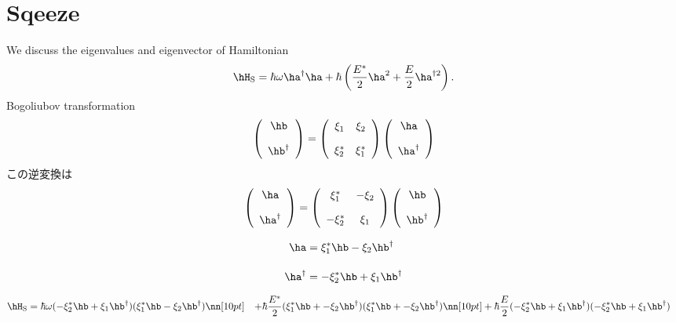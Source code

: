 \section{Sqeeze}
We discuss the eigenvalues and eigenvector of Hamiltonian
\begin{equation}
    \hH_{\rm{S}}=\hbar\omega\ha^\dag\ha + \hbar \left(\frac{E^\ast}{2}\ha^{2} + \frac{E}{2}\ha^{\dag2}\right).
\end{equation}
Bogoliubov transformation
\begin{align}
    \left( 
     \begin{array}{c}
     \hb\\[10pt]
     \hb^\dag
     \end{array}
    \right)
    =
    \left( 
     \begin{array}{cc}
     \xi_1&\xi_2 \\[10pt]
     \xi_2^{\ast}&\xi_1^{\ast}
     \end{array}
    \right)
    \left( 
     \begin{array}{c}
     \ha\\[10pt]
     \ha^\dag
     \end{array}
    \right)
\end{align}
この逆変換は
\begin{align}
    \left( 
     \begin{array}{c}
     \ha\\[10pt]
     \ha^\dag
     \end{array}
    \right)
    =
    \left( 
     \begin{array}{cc}
     \xi_1^{\ast}&-\xi_2 \\[10pt]
     -\xi_2^{\ast}&\xi_1
     \end{array}
    \right)
    \left( 
     \begin{array}{c}
     \hb\\[10pt]
     \hb^\dag
     \end{array}
    \right)
\end{align}

\begin{align}
    \ha&=\xi_1^{\ast}\hb-\xi_2\hb^\dag\\[10pt]
     \ha^\dag&=-\xi_2^{\ast}\hb+\xi_1\hb^\dag
\end{align}


\begin{align}
    \hH_{\rm{S}}&=\hbar\omega(-\xi_2^{\ast}\hb+\xi_1\hb^\dag)(\xi_1^{\ast}\hb-\xi_2\hb^\dag)\nn[10pt]
    &+ \hbar\frac{E^\ast}{2}(\xi_1^{\ast}\hb+-\xi_2\hb^\dag)(\xi_1^{\ast}\hb+-\xi_2\hb^\dag)\nn[10pt]
    &+ \hbar\frac{E}{2}(-\xi_2^{\ast}\hb+\xi_1\hb^\dag)(-\xi_2^{\ast}\hb+\xi_1\hb^\dag)
\end{align}

